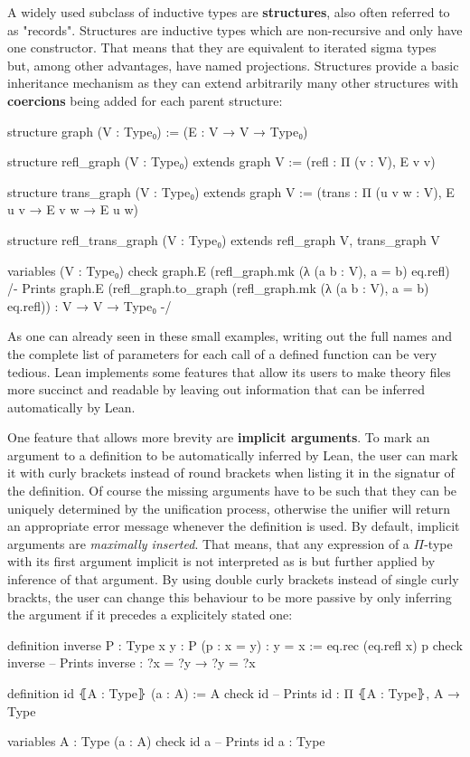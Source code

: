 A widely used subclass of inductive types are \textbf{structures}, also often
referred to as "records".
Structures are inductive types which are non-recursive and only have one constructor.
That means that they are equivalent to iterated sigma types but, among other advantages,
have named projections.
Structures provide a basic inheritance mechanism as they can extend arbitrarily
many other structures with \textbf{coercions} being added for each parent structure:
\begin{leancode}
structure graph (V : Type₀) :=
  (E : V → V → Type₀)

structure refl_graph (V : Type₀) extends graph V :=
  (refl : Π (v : V), E v v)

structure trans_graph (V : Type₀) extends graph V :=
  (trans : Π (u v w : V), E u v → E v w → E u w)

structure refl_trans_graph (V : Type₀) extends refl_graph V, trans_graph V

variables (V : Type₀)
check graph.E (refl_graph.mk (λ (a b : V), a = b) eq.refl)
/- Prints
  graph.E (refl_graph.to_graph 
    (refl_graph.mk (λ (a b : V), a = b) eq.refl)) :
    V → V → Type₀ -/
\end{leancode}

As one can already seen in these small examples, writing out the full names and
the complete list of parameters for each call of a defined function can be very
tedious.
Lean implements some features that allow its users to make theory files more
succinct and readable by leaving out information that can be inferred automatically
by Lean.

One feature that allows more brevity are \textbf{implicit arguments}.
To mark an argument to a definition to be automatically inferred by Lean,
the user can mark it with curly brackets instead of round brackets when listing
it in the signatur of the definition.
Of course the missing arguments have to be such that they can be uniquely determined
by the unification process, otherwise the unifier will return an appropriate error
message whenever the definition is used.
By default, implicit arguments are \emph{maximally inserted}.
That means, that any expression of a $\Pi$-type with its first argument implicit
is not interpreted as is but further applied by inference of that argument.
By using double curly brackets  instead of single curly brackts,
the user can change this behaviour to be more passive by only inferring the argument
if it precedes a explicitely stated one:
\begin{leancode}
definition inverse {P : Type} {x y : P} (p : x = y) : y = x :=
  eq.rec (eq.refl x) p
check inverse -- Prints inverse : ?x = ?y → ?y = ?x

definition id ⦃A : Type⦄ (a : A) := A
check id -- Prints id : Π ⦃A : Type⦄, A → Type

variables {A : Type} (a : A)
check id a -- Prints id a : Type
\end{leancode}

